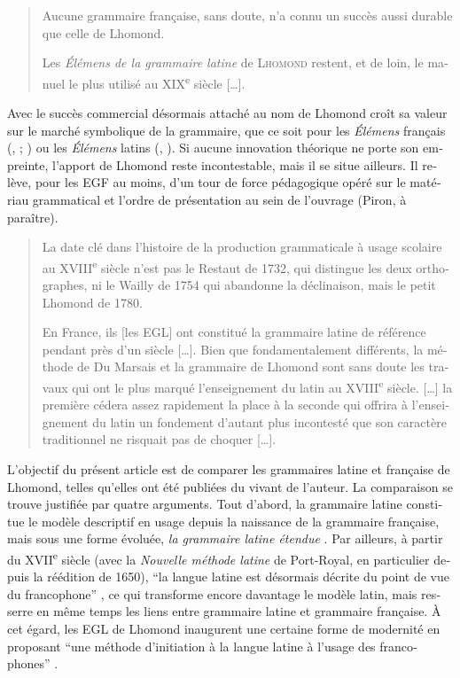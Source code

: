 \documentclass[output=paper]{langsci/langscibook}
\begin{document}
\begin{otherlanguage}{french}
\begin{quote}
    Aucune grammaire française, sans doute, n’a connu un succès aussi durable que celle de Lhomond. \citep[63]{chervel_et_1977}

    Les \textit{Élémens de la grammaire latine} de \textsc{Lhomond} restent, et de loin, le manuel le plus utilisé au XIX\textsuperscript{e} siècle […]. \citep[16]{chervel_rhetorique_1979}
\end{quote}

Avec le succès commercial désormais attaché au nom de Lhomond croît sa valeur sur le marché symbolique de la grammaire, que ce soit pour les \textit{Élémens} français (\citealt{chervel_et_1977}, \citeyear{chervel_histoire_2006}; \citealt{colombat_histoire_2010}) ou les \textit{Élémens} latins (\citealt{chervel_et_1977}, \citealt{colombat_grammaire_1999}). Si aucune innovation théorique ne porte son empreinte, l’apport de Lhomond reste incontestable, mais il se situe ailleurs. Il relève, pour les EGF au moins, d’un tour de force pédagogique opéré sur le matériau grammatical et l’ordre de présentation au sein de l’ouvrage (Piron, à paraître). 

\begin{quote}
La date clé dans l’histoire de la production grammaticale à usage scolaire au XVIII\textsuperscript{e} siècle n’est pas le Restaut de 1732, qui distingue les deux orthographes, ni le Wailly de 1754 qui abandonne la déclinaison, mais le petit Lhomond de 1780. \citep[220]{chervel_histoire_2006}

En France, ils [les EGL] ont constitué la grammaire latine de référence pendant près d’un siècle […]. Bien que fondamentalement différents, la méthode de Du Marsais et la grammaire de Lhomond sont sans doute les travaux qui ont le plus marqué l’enseignement du latin au XVIII\textsuperscript{e} siècle. […] la première cédera assez rapidement la place à la seconde qui offrira à l’enseignement du latin un fondement d’autant plus incontesté que son caractère traditionnel ne risquait pas de choquer […]. \citep[106]{colombat_grammaire_1999}
\end{quote}

L’objectif du présent article est de comparer les grammaires latine et française de Lhomond, telles qu’elles ont été publiées du vivant de l’auteur. La comparaison se trouve justifiée par quatre arguments. Tout d’abord, la grammaire latine constitue le modèle descriptif en usage depuis la naissance de la grammaire française, mais sous une forme évoluée, \textit{la grammaire latine étendue} \citep{auroux_revolution_1994}. Par ailleurs, à partir du XVII\textsuperscript{e} siècle (avec la \textit{Nouvelle méthode latine} de Port-Royal, en particulier depuis la réédition de 1650), “la langue latine est désormais décrite du point de vue du francophone” \citep[11]{colombat_a_1995}, ce qui transforme encore davantage le modèle latin, mais resserre en même temps les liens entre grammaire latine et grammaire française. À cet égard, les EGL de Lhomond inaugurent une certaine forme de modernité en proposant “une méthode d’initiation à la langue latine à l’usage des francophones” \citep[166]{colombat_grammaire_1999}.


\end{otherlanguage}
\end{document}
